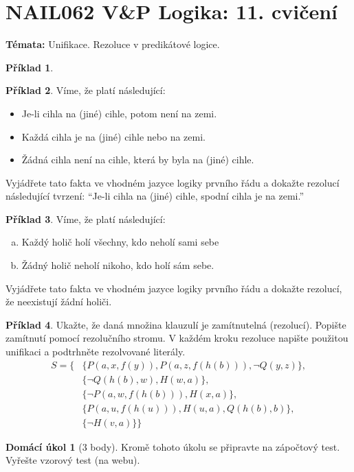 \documentclass[a4paper]{article}
\theoremstyle{definition}
\newtheorem{problem}{Příklad}
\newtheorem*{ukol}{Domácí úkol}
\begin{document}
\section*{NAIL062 V\&P Logika: 11. cvičení}


\textbf{Témata:}
Unifikace. Rezoluce v predikátové logice.


\medskip\begin{problem}
 
\end{problem}


\medskip\begin{problem} Víme, že platí následující:
    \begin{itemize}
        \item Je-li cihla na (jiné) cihle, potom není na zemi.
        \item Každá cihla je na (jiné) cihle nebo na zemi.
        \item Žádná cihla není na cihle, která by byla na (jiné) cihle.
    \end{itemize}
    Vyjádřete tato fakta ve vhodném jazyce logiky prvního řádu a dokažte rezolucí následující tvrzení: ``Je-li cihla na (jiné) cihle, spodní cihla je na zemi.''
\end{problem}
        
    
\medskip\begin{problem} Víme, že platí následující:
    \begin{enumerate}[(a)]
        \item Každý holič holí všechny, kdo neholí sami sebe
        \item Žádný holič neholí nikoho, kdo holí sám sebe.
    \end{enumerate}
    Vyjádřete tato fakta ve vhodném jazyce logiky prvního řádu a dokažte rezolucí, že neexistují žádní holiči.
\end{problem}
        
    
\medskip\begin{problem}
    Ukažte, že daná množina klauzulí je zamítnutelná (rezolucí). Popište zamítnutí pomocí rezolučního stromu. V každém kroku rezoluce napište použitou unifikaci a podtrhněte rezolvované literály.
    \begin{align*}
        S=\{
            &\{P(a,x,f(y)),P(a,z,f(h(b))),\neg Q(y,z)\},\\
            &\{\neg Q(h(b),w),H(w,a)\},\\
            &\{\neg P(a,w,f(h(b))),H(x,a)\},\\
            &\{P(a,u,f(h(u))),H(u,a),Q(h(b),b)\},\\
            &\{\neg H(v,a)\}
        \}
    \end{align*}
\end{problem}


\medskip\begin{ukol}[3 body]


Kromě tohoto úkolu se připravte na zápočtový test. Vyřešte vzorový test (na webu).
\end{ukol}
\end{document}
